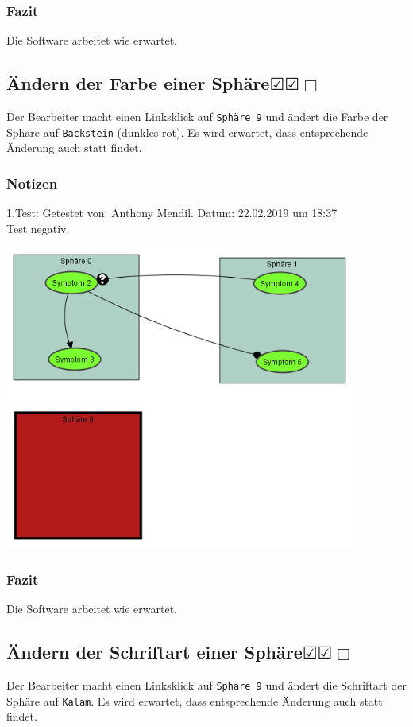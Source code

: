 \documentclass{scrartcl}
\newcommand{\subsectiont}[2]{\subsection[#1]{#1{\normalsize\normalfont #2}}}
\newcommand{\leer}{$\Box$}
\newcommand{\ok}{$\CheckedBox$}
\begin{document}
\subsubsection{Fazit}
Die Software arbeitet wie erwartet.

\subsectiont{Ändern der Farbe einer Sphäre}{\dotfill\ok\ok\leer}
Der Bearbeiter macht einen Linksklick auf \texttt{Sphäre 9} und ändert die Farbe der Sphäre auf \texttt{Backstein} (dunkles rot). Es wird erwartet, dass entsprechende Änderung auch statt findet. 
\subsubsection{Notizen}
1.Test: Getestet von: Anthony Mendil. Datum: 22.02.2019 um 18:37 \\
Test negativ.
\begin{center}
\includegraphics[height=10cm]{2_14.PNG}
\end{center}
\subsubsection{Fazit}
Die Software arbeitet wie erwartet.

\subsectiont{Ändern der Schriftart einer Sphäre}{\dotfill\ok\ok\leer}
Der Bearbeiter macht einen Linksklick auf \texttt{Sphäre 9} und ändert die Schriftart der Sphäre auf \texttt{Kalam}. Es wird erwartet, dass entsprechende Änderung auch statt findet. 
\end{document}
